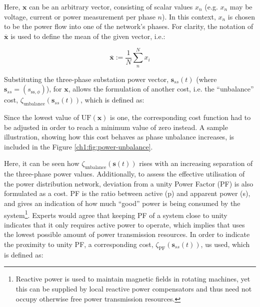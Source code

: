 

Here, $\textbf{x}$ can be an arbitrary vector, consisting of scalar values $x_n$ (e.g. $x_n$ may be voltage, current or power measurement per phase $n$).
In this context, $x_n$ is chosen to be the power flow into one of the network's phases.
For clarity, the notation of $\overline{\textbf{x}}$ is used to define the mean of the given vector, i.e.:

\begin{equation}
	\overline{\textbf{x}} := \frac{1}{N}\sum_n^N{x_i}
\end{equation}


Substituting the three-phase substation power vector, $\textbf{s}_{ss}(t)$ (where $\textbf{s}_{ss} = (s_{\text{ss},\phi})$), for $\textbf{x}$, allows the formulation of another cost, i.e. the ``unbalance'' cost, $\zeta_\text{unbalance}(\textbf{s}_{ss}(t))$, which is defined as:



Since the lowest value of $\text{UF}(\textbf{x})$ is one, the corresponding cost function had to be adjusted in order to reach a minimum value of zero instead.
A sample illustration, showing how this cost behaves as phase unbalance increases, is included in the Figure \ref{ch1:fig:power-unbalance}.




Here, it can be seen how $\zeta_\text{unbalance}(\textbf{s}(t))$ rises with an increasing separation of the three-phase power values.
Additionally, to assess the effective utilisation of the power distribution network, deviation from a unity Power Factor (PF) is also formulated as a cost.
PF is the ratio between active (p) and apparent power (s), and gives an indication of how much ``good'' power is being consumed by the system\footnote[1]{Reactive power is used to maintain magnetic fields in rotating machines, yet this can be supplied by local reactive power compensators and thus need not occupy otherwise free power transmission resources.}.
Experts would agree that keeping PF of a system close to unity indicates that it only requires active power to operate, which implies that uses the lowest possible amount of power transmission resources.
In order to indicate the proximity to unity PF, a corresponding cost, $\zeta_\text{PF}(\textbf{s}_{ss}(t))$, us used, which is defined as:

